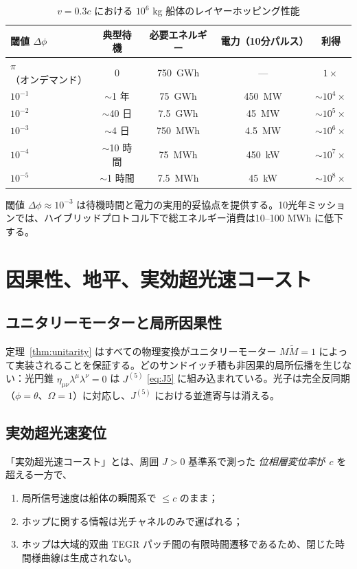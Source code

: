 \documentclass[dvipdfmx,a4paper]{article}
\theoremstyle{definition}
\begin{document}
\begin{table}[ht]
\centering
\caption{$v=0.3c$ における $10^6$ kg 船体のレイヤーホッピング性能}
\label{tab:layerhop}
\begin{tabular}{@{}lcccc@{}}
\toprule
閾値 $\Delta\phi$ & 典型待機 & 必要エネルギー & 電力（10分パルス） & 利得 \\
\midrule
$\pi$（オンデマンド） & 0 & \qty{750}{GWh} & --- & $1\times$ \\
$10^{-1}$ & $\sim$1 年 & \qty{75}{GWh} & \qty{450}{MW} & $\sim 10^4\times$ \\
$10^{-2}$ & $\sim$40 日 & \qty{7.5}{GWh} & \qty{45}{MW} & $\sim 10^5\times$ \\
$10^{-3}$ & $\sim$4 日 & \qty{750}{MWh} & \qty{4.5}{MW} & $\sim 10^6\times$ \\
$10^{-4}$ & $\sim$10 時間 & \qty{75}{MWh} & \qty{450}{kW} & $\sim 10^7\times$ \\
$10^{-5}$ & $\sim$1 時間 & \qty{7.5}{MWh} & \qty{45}{kW} & $\sim 10^8\times$ \\
\bottomrule
\end{tabular}
\end{table}

閾値 $\Delta\phi\approx 10^{-3}$ は待機時間と電力の実用的妥協点を提供する。10光年ミッションでは、ハイブリッドプロトコル下で総エネルギー消費は10--100 MWh に低下する。

\section{因果性、地平、実効超光速コースト}
\label{sec:causality}

\subsection{ユニタリーモーターと局所因果性}

定理~\ref{thm:unitarity} はすべての物理変換がユニタリーモーター $M\widetilde{M}=1$ によって実装されることを保証する。どのサンドイッチ積も非因果的局所伝播を生じない：光円錐 $\eta_{\mu\nu}\lambda^\mu\lambda^\nu=0$ は $J^{(5)}$ \eqref{eq:J5} に組み込まれている。光子は完全反同期（$\phi=\theta$、$\Omega=1$）に対応し、$J^{(5)}$ における並進寄与は消える。

\subsection{実効超光速変位}

「実効超光速コースト」とは、周囲 $J>0$ 基準系で測った \emph{位相層変位率}が $c$ を超える一方で、
\begin{enumerate}[leftmargin=2em]
  \item 局所信号速度は船体の瞬間系で $\le c$ のまま；
  \item ホップに関する情報は光チャネルのみで運ばれる；
  \item ホップは大域的双曲 TEGR パッチ間の有限時間遷移であるため、閉じた時間様曲線は生成されない。
\end{enumerate}
\end{document}
